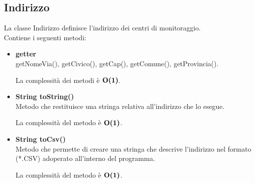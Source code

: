 \documentclass[a4paper, 12pt]{scrreprt}
\begin{document}
			\subsection{Indirizzo}
			La classe Indirizzo definisce l'indirizzo dei centri di monitoraggio.
			\\Contiene i seguenti metodi:\\
			\begin{itemize}
				\item \textbf{getter}
				\\ getNomeVia(), getCivico(), getCap(), getComune(), getProvincia().
				
				La complessit\`a dei metodi \`e $\mathbf{O}\textbf{(1)}$.
				
				\item \textbf{String toString()}
				\\Metodo che restituisce una stringa relativa all'indirizzo che lo esegue.
				
				La complessit\`a del metodo \`e $\mathbf{O}\textbf{(1)}$.
				
				\item \textbf{String toCsv()}
				\\Metodo che permette di creare una stringa che descrive l'indirizzo nel formato (*.CSV) adoperato all'interno del programma.
				
				La complessit\`a del metodo \`e $\mathbf{O}\textbf{(1)}$.
				
			\end{itemize}
\end{document}
